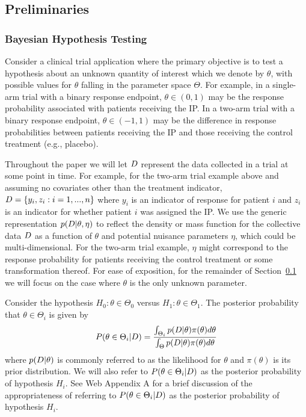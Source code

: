 \documentclass[AMA,STIX1COL,doublespace]{WileyNJD-v2}
\begin{document}
\subsection{Preliminaries}\label{sec:preliminaries}
\subsubsection{Bayesian Hypothesis Testing}
Consider a clinical trial application where the primary objective is to test a hypothesis about an unknown quantity of interest which we denote by $\theta$, with possible values
for $\theta$ falling in the parameter space $\Theta$.
%
For example, in a single-arm trial with a binary response endpoint, $\theta \in (0,1)$ may be the response probability associated with patients receiving the IP.
%
In a two-arm trial with a binary response endpoint, $\theta \in (-1,1)$ may be the difference in response probabilities between patients receiving the IP and those receiving the control treatment (e.g., placebo).

Throughout the paper we will let $\boldmath{D}$ represent the data collected in a trial at some point in time. 
%
For example, for the two-arm trial example above and assuming no covariates other than the treatment indicator, $\boldmath{D}=\left\{y_i,z_i:i=1,...,n\right\}$ where $y_i$ is an indicator of response for patient $i$ and $z_i$ is an indicator for whether patient $i$ was assigned the IP.
%
We use the generic representation $p(\boldmath{D}|\theta,\eta)$ to reflect the density or mass function for the collective data $\boldmath{D}$ as 
a function of $\theta$ and potential nuisance parameters $\eta$, which could be multi-dimensional.
%
For the two-arm trial example, $\eta$ might correspond to the response probability for patients receiving the control treatment or some transformation thereof. 
For ease of exposition, for the remainder of Section~\ref{sec:preliminaries} we will focus on the case where $\theta$ is the only unknown parameter.

Consider the hypothesis $H_0:\theta\in\Theta_{0}$ versus $H_1:\theta\in\Theta_{1}$. The posterior probability that $\theta\in\Theta_i$ is given by
\begin{align}
P(\theta\in\Theta_i|\boldmath{D})
=\frac{\int_{\Theta_i} p(\boldmath{D}|\theta)\pi (\theta)d\theta}{\int_{\Theta}p(\boldmath{D}|\theta)\pi(\theta) d\theta}
\end{align}
where $p(\boldmath{D}|\theta)$ is commonly referred to as the likelihood for $\theta$ and $\pi(\theta)$ is its prior distribution. 
%
%
%
We will also refer to $P(\theta\in\Theta_i|\boldmath{D})$ as the posterior probability of hypothesis $H_i$.
%
See Web Appendix A for a brief discussion of the appropriateness of referring to $P(\theta\in\Theta_i|\boldmath{D})$
as the posterior probability of hypothesis $H_i$.
\end{document}
